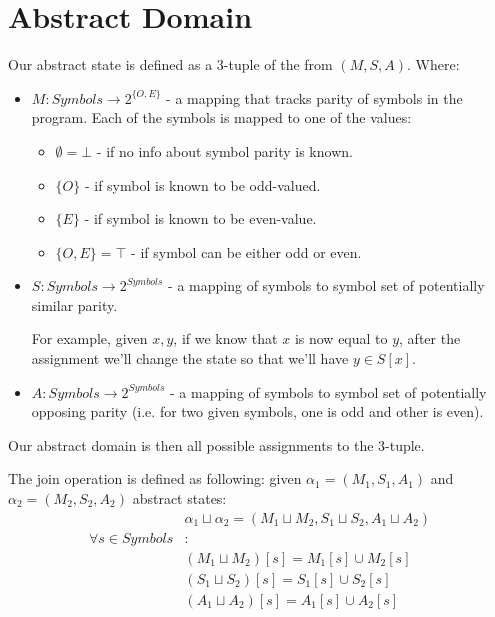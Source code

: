 \section*{Abstract Domain}
Our abstract state is defined as a 3-tuple of the from $(M,S,A)$. Where:

\begin{itemize}
	\item $M: Symbols \rightarrow 2^{\{O, E\}}$ - a mapping that tracks parity of symbols in the program. Each of the symbols is mapped to one of the values:
	\begin{itemize}
		\item $\emptyset=\bot$ - if no info about symbol parity is known.
		\item $\{O\}$ - if symbol is known to be odd-valued.
		\item $\{E\}$ - if symbol is known to be even-value.
		\item $\{O,E\}=\top$ - if symbol can be either odd or even.
	\end{itemize}
	\item $S: Symbols \rightarrow 2^{Symbols}$ - a mapping of symbols to symbol set of potentially similar parity.
	
	For example, given $x, y$, if we know that $x$ is now equal to $y$, after the assignment we'll change the state so that we'll have $y \in S[x]$.
	
	\item $A: Symbols \rightarrow 2^{Symbols}$ - a mapping of symbols to symbol set of potentially opposing parity (i.e. for two given symbols, one is odd and other is even).

\end{itemize}
Our abstract domain is then all possible assignments to the 3-tuple.
	
The join operation is defined as following: given $\alpha_1=(M_1,S_1,A_1)$ and $\alpha_2=(M_2,S_2,A_2)$ abstract states:
\begin{align*}
&\alpha_1\sqcup\alpha_2=(M_1\sqcup M_2, S_1 \sqcup S_2, A_1 \sqcup A_2) \\
\forall s \in Symbols&:  \\
&(M_1\sqcup M_2)[s] =M_1[s] \cup M_2[s] \\
&(S_1\sqcup S_2)[s] =S_1[s] \cup S_2[s] \\
&(A_1\sqcup A_2)[s] =A_1[s] \cup A_2[s]
\end{align*}

